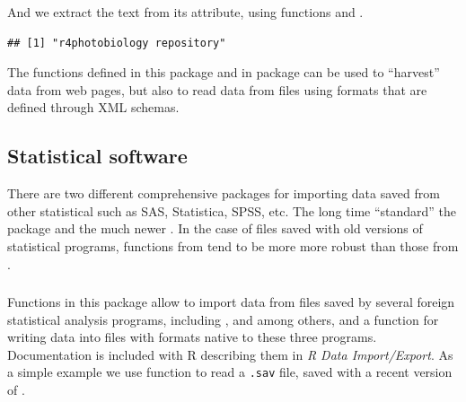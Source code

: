 \documentclass[krantz2,ChapterTOCs]{krantz}\usepackage{knitr}
\begin{document}
And we extract the text from its  attribute, using functions  and .

\begin{knitrout}\footnotesize
{}\color{fgcolor}\begin{kframe}
\begin{alltt}
\hlstd{(} \hlstd{))}
\end{alltt}
\begin{verbatim}
## [1] "r4photobiology repository"
\end{verbatim}
\end{kframe}
\end{knitrout}

The functions defined in this package and in package  can be used to ``harvest'' data from web pages, but also to read data from files using formats that are defined through XML schemas.

\subsection{Statistical software}\label{sec:files:stat}

There are two different comprehensive packages for importing data saved from other statistical such as SAS, Statistica, SPSS, etc. The long time ``standard'' the  package and the much newer . In the case of files saved with old versions of statistical programs, functions from  tend to be more more robust than those from .

\subsubsection[foreign]{}

Functions in this package allow to import data from files saved by several foreign statistical analysis programs, including ,  and  among others, and a function for writing data into files with formats native to these three programs. Documentation is included with R describing them in \emph{R Data Import/Export}. As a simple example we use function  to read a \texttt{.sav} file, saved with a recent version of .
\end{document}
